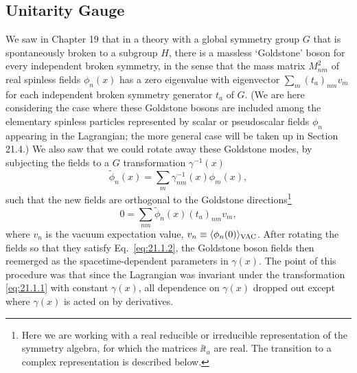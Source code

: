 \subsection{Unitarity Gauge}
\label{sec:21.1}

We saw in Chapter 19 that in a theory with a global symmetry group $G$ that
is spontaneously broken to a subgroup $H$, there is a massless `Goldstone'
boson for every independent broken symmetry, in the sense that the mass
matrix $M^2_{nm}$ of real spinless fields $\phi_n(x)$ has a zero eigenvalue
with eigenvector $\sum_m(t_a)_{nm}v_m$ for each independent broken
symmetry generator $t_a$ of $G$. (We are here considering the case
where these Goldstone bosons are included among the elementary spinless
particles represented by scalar or pseudoscalar fields $\phi_n$ appearing
in the Lagrangian; the more general case will be taken up in Section 21.4.)
We also saw that we could rotate away these Goldstone modes, by subjecting
the fields to a $G$ transformation $\gamma^{-1}(x)$
\begin{equation}
 \widetilde{\phi}_n(x)
 =\sum_m\gamma^{-1}_{nm}(x)\phi_m(x),
 \tag{21.1.1}\label{eq:21.1.1}
\end{equation}
such that the new fields are orthogonal to the Goldstone
directions\footnote{Here we are working with a real reducible or irreducible
representation of the symmetry algebra, for which the matrices $\ii t_a$
are real. The transition to a complex representation is described below.}
\begin{equation}
 0=\sum_{nm}\widetilde{\phi}_n(x)(t_a)_{nm}v_m,
 \tag{21.1.2}\label{eq:21.1.2}
\end{equation}
where $v_n$ is the vacuum expectation value,
$v_n\equiv\langle\phi_n(0)\rangle_{\rm VAC}$. After rotating the fields so
that they satisfy Eq.~\eqref{eq:21.1.2}, the Goldstone boson fields then
reemerged as the spacetime-dependent parameters in $\gamma(x)$. The point
of this procedure was that since the Lagrangian was invariant under the
transformation \eqref{eq:21.1.1} with constant $\gamma(x)$, all dependence
on $\gamma(x)$ dropped out except where $\gamma(x)$ is acted on by
derivatives.

